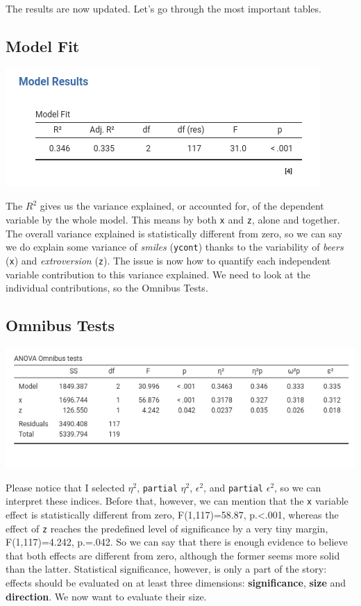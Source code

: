 \documentclass[
]{book}
\begin{document}
The results are now updated. Let's go through the most important tables.

\hypertarget{twofit2}{%
\subsection{Model Fit}\label{twofit2}}

\includegraphics[width=0.7\linewidth]{bookletpics/2_output6}

The \(R^2\) gives us the variance explained, or accounted for, of the dependent variable by the whole model. This means by both \texttt{x} and \texttt{z}, alone and together. The overall variance explained is statistically different from zero, so we can say we do explain some variance of \emph{smiles} (\texttt{ycont}) thanks to the variability of \emph{beers} (\texttt{x}) and \emph{extroversion} (\texttt{z}). The issue is now how to quantify each independent variable contribution to this variance explained. We need to look at the individual contributions, so the {Omnibus Tests}.

\hypertarget{variances}{%
\subsection{Omnibus Tests}\label{variances}}

\includegraphics[width=0.9\linewidth]{bookletpics/2_output7}

Please notice that I selected \(\eta^2\), \texttt{partial} \(\eta^2\), \(\epsilon^2\), and \texttt{partial} \(\epsilon^2\), so we can interpret these indices. Before that, however, we can mention that the \texttt{x} variable effect is statistically different from zero, F(1,117)=58.87, p.\textless.001, whereas the effect of \texttt{z} reaches the predefined level of significance by a very tiny margin, F(1,117)=4.242, p.=.042. So we can say that there is enough evidence to believe that both effects are different from zero, although the former seems more solid than the latter. Statistical significance, however, is only a part of the story: effects should be evaluated on at least three dimensions: \textbf{significance}, \textbf{size}
and \textbf{direction}. We now want to evaluate their size.
\end{document}
